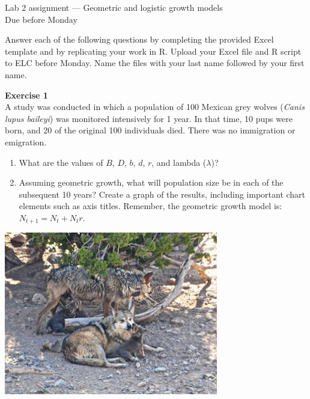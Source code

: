 \documentclass[12pt]{article}\usepackage[]{graphicx}\usepackage[]{color}
\begin{document}
{
  \Large
  \centering
  Lab 2 assignment --- Geometric and logistic growth models \\
  Due before Monday \par
}

Answer each of the following questions by completing the provided Excel 
template and by replicating your work in R. Upload your Excel file and R script to 
ELC before Monday. Name the files with your last name followed by your first name. \\

\vspace{12pt}

{\bf Exercise 1 \\}
A study was conducted in which a population of 100 Mexican grey wolves
({\it Canis lupus baileyi}) was monitored intensively for 1 year. In
that time, 10 pups were born, and 20 of the original 100 individuals 
died. There was no immigration or emigration.  

\begin{enumerate}
  \item What are the values of $B$, $D$, $b$, $d$, $r$, and lambda
    ($\lambda$)?
  \item Assuming geometric growth, what will population size be in
    each of the subsequent 10 years? Create a graph of the results,
    including important chart elements such as axis titles. Remember,
    the geometric growth model is: $N_{t+1} = N_t + N_t r$.
\end{enumerate}

\vspace{24pt}

{
  \centering
  \includegraphics[width=0.7\textwidth]{figs/Coronadopack2} \\
}


\clearpage

\end{document}
